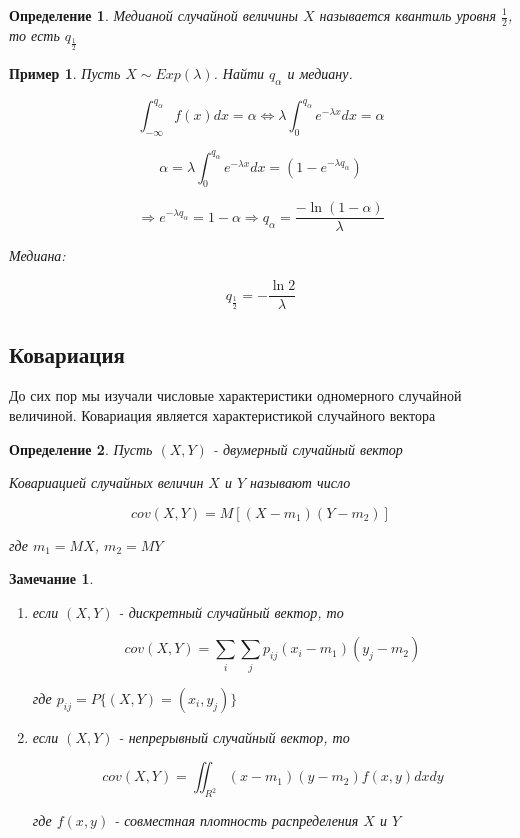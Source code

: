 \documentclass[a4paper, 14pt]{report}
\newtheorem{defenition}{Определение}[section]
\newtheorem{note}{Замечание}[section]
\newtheorem{example}{Пример}[section]
\begin{document}
\begin{defenition}
    Медианой случайной величины $X$ называется квантиль уровня $\frac{1}{2}$, то есть $q_{\frac{1}{2}}$
\end{defenition}

\begin{example}
    Пусть $X \sim Exp(\lambda)$. Найти $q_\alpha$ и медиану.

    $$
    \int_{-\infty}^{q_\alpha} f(x) dx = \alpha \Leftrightarrow \lambda \int_0^{q_\alpha} e^{-\lambda x} dx = \alpha
    $$

    $$
    \alpha = \lambda \int_{0}^{q_\alpha} e^{-\lambda x} dx = (1-e^{-\lambda q_\alpha})
    $$

    $$
    \Rightarrow e^{-\lambda q_\alpha} = 1 - \alpha \Rightarrow q_\alpha = \frac{-\ln(1-\alpha)}{\lambda}
    $$

    Медиана:

    $$
    q_{\frac{1}{2}} = -\frac{\ln2}{\lambda}
    $$
\end{example}

\subsection{Ковариация}

До сих пор мы изучали числовые характеристики одномерного случайной величиной. Ковариация является характеристикой случайного вектора

\begin{defenition}
    Пусть $(X,Y)$ - двумерный случайный вектор

    Ковариацией случайных величин $X$ и $Y$ называют число

    $$
    cov(X,Y) = M[(X-m_1)(Y-m_2)]
    $$

    где $m_1 = MX$, $m_2 = MY$
\end{defenition}

\begin{note}
    \begin{enumerate}
        \item если $(X,Y)$ - дискретный случайный вектор, то

            $$
            cov(X,Y) = \sum_i \sum_j p_{ij} (x_i - m_1)(y_j - m_2)
            $$

            где $p_{ij} = P\{ (X,Y) = (x_i, y_j) \}$

        \item если $(X,Y)$ - непрерывный случайный вектор, то

            $$
            cov(X,Y) = \iint_{R^2} (x-m_1)(y-m_2)f(x,y)dxdy
            $$

            где $f(x,y)$ - совместная плотность распределения $X$ и $Y$
    \end{enumerate}
\end{note}
\end{document}
